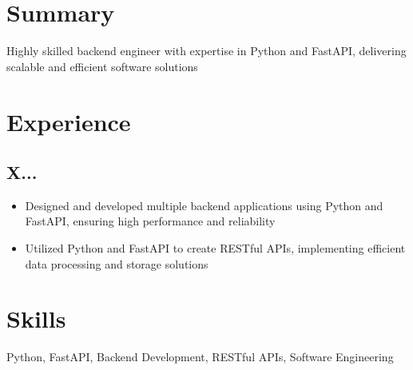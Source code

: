 \documentclass[11pt]{article}
\begin{document}
\section*{Summary}
Highly skilled backend engineer with expertise in Python and FastAPI, delivering scalable and efficient software solutions

\section*{Experience}
\subsection*{X...}
\begin{itemize}
\item Designed and developed multiple backend applications using Python and FastAPI, ensuring high performance and reliability
\item Utilized Python and FastAPI to create RESTful APIs, implementing efficient data processing and storage solutions
\end{itemize}

\section*{Skills}
Python, FastAPI, Backend Development, RESTful APIs, Software Engineering
\end{document}
